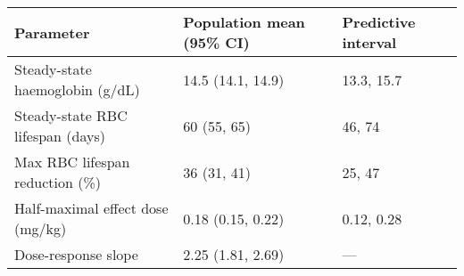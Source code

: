 
\begin{tabular}{lll}
\toprule
Parameter & Population mean (95\% CI) & Predictive interval\\
\midrule
Steady-state haemoglobin (g/dL) & 14.5 (14.1, 14.9) & 13.3, 15.7\\
Steady-state RBC lifespan (days) & 60 (55, 65) & 46, 74\\
Max RBC lifespan reduction (\%) & 36 (31, 41) & 25, 47\\
Half-maximal effect dose (mg/kg) & 0.18 (0.15, 0.22) & 0.12, 0.28\\
Dose-response slope & 2.25 (1.81, 2.69) & ---\\
\bottomrule
\end{tabular}